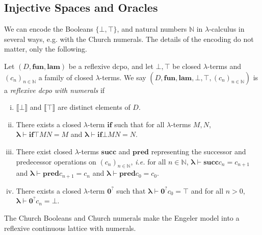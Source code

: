 \documentclass{lmcs}
\newcommand{\sembrack}[1]{\llbracket{#1}\rrbracket}
\newcommand{\N}{\ensuremath{\mathbb{N}}}
\newcommand{\Zero}{\mathcal{Z}}
\newcommand{\If}{\mathbf{if}}
\renewcommand{\Zero}{\mathbf{0}^?}
\renewcommand{\succ}{\mathbf{succ}}
\newcommand{\pred}{\mathbf{pred}}
\newcommand{\lamth}{\boldsymbol{\lambda}} %
\newcommand{\fun}{\mathbf{fun}}
\newcommand{\lam}{\mathbf{lam}}
\begin{document}
\subsection{Injective Spaces and Oracles}
We can encode the Booleans $\{\bot,\top\}$, and natural numbers $\N$ in $\lambda$-calculus in several ways, e.g. with the Church numerals. The details of the encoding do not matter, only the following.

\begin{defi}
	\label{EncodingDef}
	Let $(D, \fun, \lam)$ be a reflexive dcpo, and let $\bot, \top$ be closed $\lambda$-terms and $(c_n)_{n \in \N}$ a family of closed $\lambda$-terms. We say $(D,\fun,\lam,\bot,\top,(c_n)_{n \in \N})$ is a \emph{reflexive dcpo with numerals} if
	\begin{enumerate}[(i)]
		\item $\sembrack{\bot}$ and $\sembrack{\top}$ are distinct elements of $D$.
		\item There exists a closed $\lambda$-term $\If$ such that for all $\lambda$-terms $M,N$, $\lamth \vdash \If \top M N = M$ and $\lamth \vdash \If \bot M N = N$. 
		\item There exist closed $\lambda$-terms $\succ$ and $\pred$ representing the successor and predecessor operations on $(c_n)_{n \in \N}$, \emph{i.e.} for all $n \in \N$, $\lamth \vdash \succ c_n = c_{n+1}$ and $\lamth \vdash \pred c_{n+1} = c_n$ and $\lamth \vdash \pred c_0 = c_0$. 
		\item There exists a closed $\lambda$-term $\Zero$ such that $\lamth \vdash \Zero c_0 = \top$ and for all $n > 0$, $\lamth \vdash \Zero c_n = \bot$. 
	\end{enumerate}
\end{defi}

\begin{prop}
	\label{GraphEngelerHaveNumeralsProp}
	The Church Booleans and Church numerals make the Engeler model into a reflexive continuous lattice with numerals.
\end{prop}
\end{document}
